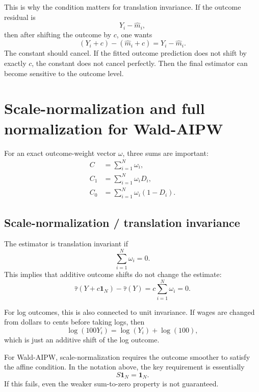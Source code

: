 \documentclass[11pt,a4paper]{article}
\begin{document}
This is why the condition matters for translation invariance. If the outcome
residual is
\begin{equation}
    Y_i - \hat m_i,
\end{equation}
then after shifting the outcome by \(c\), one wants
\begin{equation}
    (Y_i+c) - (\hat m_i+c) = Y_i-\hat m_i.
\end{equation}
The constant should cancel. If the fitted outcome prediction does not shift by
exactly \(c\), the constant does not cancel perfectly. Then the final estimator
can become sensitive to the outcome level.

\section{Scale-normalization and full normalization for Wald-AIPW}

For an exact outcome-weight vector \(\omega\), three sums are important:
\begin{align}
    C   &= \sum_{i=1}^N \omega_i, \\
    C_1 &= \sum_{i=1}^N \omega_i D_i, \\
    C_0 &= \sum_{i=1}^N \omega_i(1-D_i).
\end{align}

\subsection{Scale-normalization / translation invariance}

The estimator is translation invariant if
\begin{equation}
    \sum_{i=1}^N \omega_i = 0.
    \label{eq:sum_zero}
\end{equation}
This implies that additive outcome shifts do not change the estimate:
\begin{equation}
    \hat\tau(Y+c\mathbf{1}_N)-\hat\tau(Y)
    =
    c\sum_{i=1}^N\omega_i
    =
    0.
\end{equation}

For log outcomes, this is also connected to unit invariance. If wages are changed
from dollars to cents before taking logs, then
\begin{equation}
    \log(100Y_i) = \log(Y_i)+\log(100),
\end{equation}
which is just an additive shift of the log outcome.

For Wald-AIPW, scale-normalization requires the outcome smoother to satisfy the
affine condition. In the notation above, the key requirement is essentially
\begin{equation}
    S\mathbf{1}_N=\mathbf{1}_N.
\end{equation}
If this fails, even the weaker sum-to-zero property is not guaranteed.
\end{document}
